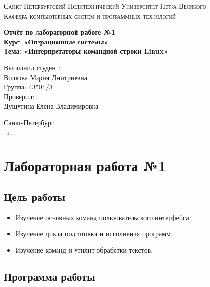 \documentclass[14pt,a4paper,report]{report}
\begin{document}
\def\contentsname{Содержание}

\begin{titlepage}
	\begin{center}
		\textsc{Санкт-Петербургский Политехнический 
			Университет Петра Великого\\[5mm]
			Кафедра компьютерных систем и программных технологий}
		
		\vfill
		
		\textbf{Отчёт по лабораторной работе №1\\[3mm]
			Курс: «Операционные системы»\\[6mm]
			Тема: «Интерпретаторы командной строки Linux»\\[35mm]
		}
	\end{center}
	
	\hfill
	\begin{minipage}{.5\textwidth}
		Выполнил студент:\\[2mm] 
		Волкова Мария Дмитриевна\\
		Группа: 43501/3\\[5mm]
		
		Проверил:\\[2mm] 
		Душутина Елена Владимировна
	\end{minipage}
	\vfill
	\begin{center}
		Санкт-Петербург\\ \the\year\ г.
	\end{center}
\end{titlepage}

\tableofcontents
\clearpage

\chapter{Лабораторная работа №1}

\section{Цель работы}

\begin{itemize}
	\item Изучение основных команд пользовательского интерфейса.
	\item Изучение цикла подготовки и исполнения программ.
	\item Изучение команд и утилит обработки текстов.
\end{itemize}

\section{Программа работы}
\end{document}
